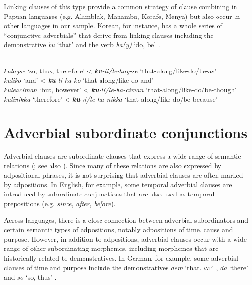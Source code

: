 \documentclass[output=paper,colorlinks,citecolor=brown]{langscibook}
\begin{document}
Linking clauses of this type provide a common strategy of clause combining in Papuan languages (e.g. Alamblak, Manambu, Korafe, Menya) but also occur in other languages in our sample. Korean, for instance, has a whole series of “conjunctive adverbials” that derive from linking clauses including the demonstrative \textit{ku} ‘that’ and the verb \textit{ha(y)} ‘do, be’ .

\ea\label{ex:diessel:31}
\\
\ea  \textit{kulayse} ‘so, thus, therefore’ < \textbf{\textit{ku}}\textit{-li/le-hay-se} ‘that-along/like-do/be-as’\\
\ex \textit{kuliko} ‘and’ < \textbf{\textit{ku}}\textit{-li-ha-ko} ‘that-along/like-do-and’\\
\ex  \textit{kulehciman} ‘but, however’ < \textbf{\textit{ku}}\textit{-li/le-ha-ciman} ‘that-along/like-do/be-though’\\
\ex  \textit{kulinikka} ‘therefore’ < \textbf{\textit{ku}}\textit{-li/le-ha-nikka} ‘that-along/like-do/be-because’\\
\z
\z

\section{Adverbial subordinate conjunctions}\label{sec:diessel:7}

Adverbial clauses are subordinate clauses that express a wide range of semantic relations (\citealt{ThompsonEtAl2007}; see also \citealt{Diessel2019Network}). Since many of these relations are also expressed by adpositional phrases, it is not surprising that adverbial clauses are often marked by adpositions. In English, for example, some temporal adverbial clauses are introduced by subordinate conjunctions that are also used as temporal prepositions (e.g. \textit{since}, \textit{after}, \textit{before}). 

Across languages, there is a close connection between adverbial subordinators and certain semantic types of adpositions, notably adpositions of time, cause and purpose. However, in addition to adpositions, adverbial clauses occur with a wide range of other subordinating morphemes, including morphemes that are historically related to demonstratives. In German, for example, some adverbial clauses of time and purpose include the demonstratives \textit{dem} ‘that.\textsc{dat}’ , \textit{da} ‘there’  and \textit{so} ‘so, thus’ .
\end{document}
